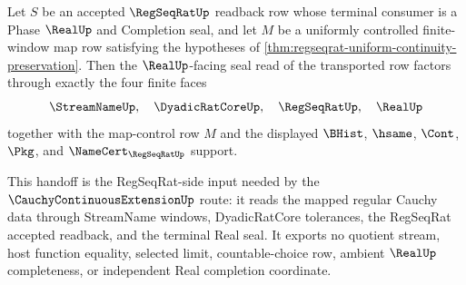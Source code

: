 \begin{theorem}
\label{thm:regseqrat-uniform-continuity-real-seal-handoff}
Let $S$ be an accepted $\RegSeqRatUp$ readback row whose terminal consumer is a
Phase $\RealUp$ and Completion seal, and let $M$ be a uniformly controlled
finite-window map row satisfying the hypotheses of
\autoref{thm:regseqrat-uniform-continuity-preservation}. Then the
$\RealUp$-facing seal read of the transported row factors through exactly the
four finite faces
$$
\StreamNameUp,\quad \DyadicRatCoreUp,\quad \RegSeqRatUp,\quad \RealUp
$$
together with the map-control row $M$ and the displayed $\BHist$, $\hsame$,
$\Cont$, $\Pkg$, and $\NameCert_{\RegSeqRatUp}$ support.

This handoff is the RegSeqRat-side input needed by the
$\CauchyContinuousExtensionUp$ route: it reads the mapped regular Cauchy data
through StreamName windows, DyadicRatCore tolerances, the RegSeqRat accepted
readback, and the terminal Real seal. It exports no quotient stream, host
function equality, selected limit, countable-choice row, ambient $\RealUp$
completeness, or independent Real completion coordinate.
\end{theorem}

